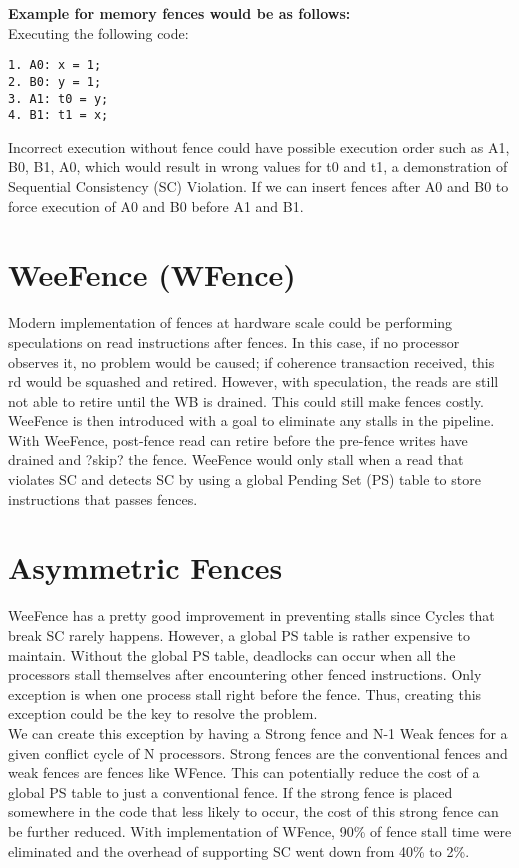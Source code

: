 \documentclass[twoside]{article}
\begin{document}
{\bfseries Example for memory fences would be as follows:}\\
Executing the following code: 
\begin{verbatim}
1. A0: x = 1; 
2. B0: y = 1; 
3. A1: t0 = y; 
4. B1: t1 = x;
\end{verbatim}

Incorrect execution without fence could have possible execution order such as A1, B0, B1, A0, which would result in wrong values for t0 and t1, a demonstration of Sequential Consistency (SC) Violation. If we can insert fences after A0 and B0 to force execution of A0 and B0 before A1 and B1.
\section{ WeeFence (WFence)} 
Modern implementation of fences at hardware scale could be performing speculations on read instructions after fences. In this case, if no processor observes it, no problem would be caused; if coherence transaction received, this rd would be squashed and retired. However, with speculation, the reads are still not able to retire until the WB is drained. This could still make fences costly. \\

WeeFence is then introduced with a goal to eliminate any stalls in the pipeline. With WeeFence, post-fence read can retire before the pre-fence writes have drained and ?skip? the fence. WeeFence would only stall when a read that violates SC and detects SC by using a global Pending Set (PS) table to store instructions that passes fences.\\

\section{ Asymmetric Fences} 
WeeFence has a pretty good improvement in preventing stalls since Cycles that break SC rarely happens. However, a global PS table is rather expensive to maintain. Without the global PS table, deadlocks can occur when all the processors stall themselves after encountering other fenced instructions. Only exception is when one process stall right before the fence. Thus, creating this exception could be the key to resolve the problem.\\ 

We can create this exception by having a Strong fence and N-1 Weak fences for a given conflict cycle of N processors. Strong fences are the conventional fences and weak fences are fences like WFence. This can potentially reduce the cost of a global PS table to just a conventional fence. If the strong fence is placed somewhere in the code that less likely to occur, the cost of this strong fence can be further reduced. With implementation of WFence, 90\% of fence stall time were eliminated and the overhead of supporting SC went down from 40\% to 2\%. \\
\end{document}
